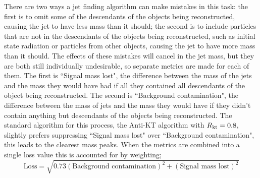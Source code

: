 There are two ways a jet finding algorithm can make mistakes in this task:
the first is to omit some of the descendants of the objects being reconstructed, causing the jet to have less mass than it should;
the second is to include particles that are not in the descendants of the objects being reconstructed, such as initial state radiation or particles from other objects,
causing the jet to have more mass than it should.
The effects of these mistakes will cancel in the jet mass,
but they are both still individually undesirable,
so separate metrics are made for each of them.
The first is ``Signal mass lost", the difference between the mass of the jets and the mass they would have had if all they contained all descendants of the object being reconstructed.
The second is ``Background contamination", the difference between the mass of jets and the mass they would have if they didn't contain anything but descendants of the objects being reconstructed.
The standard algorithm for this process, the Anti-KT algorithm with \(R{}_\text{kt}=0.8\), slightly prefers suppressing ``Signal mass lost" over ``Background contamination",
this leads to the clearest mass peaks.
When the metrics are combined into a single loss value this is accounted for by weighting;
\begin{equation}\label{eqn:loss}
\text{Loss} = \sqrt{0.73(\text{Background contamination})^2 + (\text{Signal mass lost})^2}
\end{equation}

